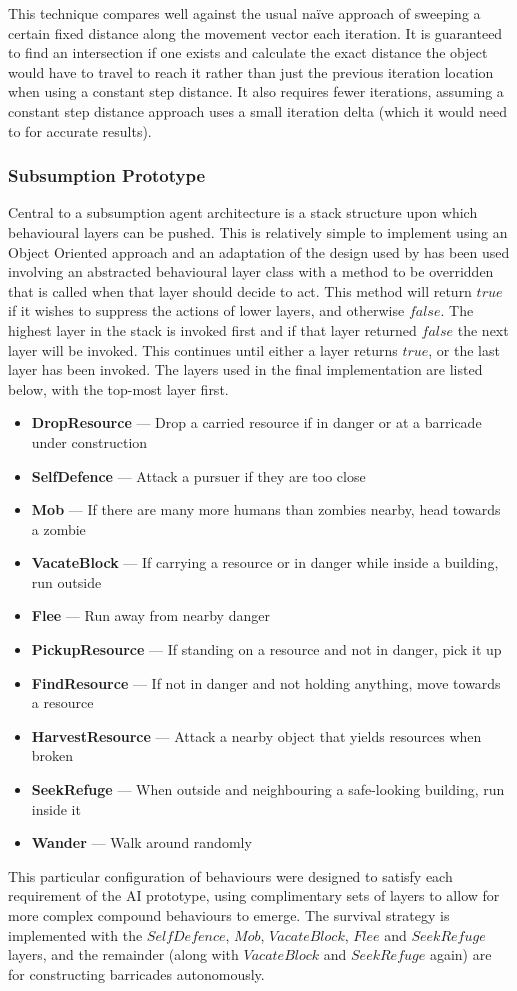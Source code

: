 \documentclass[a4paper,12pt]{article}
\newcommand{\layer}[2]{\item \textbf{#1} --- #2\vspace{-1mm}}
\begin{document}
This technique compares well against the usual na\"{i}ve approach of sweeping a certain fixed distance along the movement vector each iteration. It is guaranteed to find an intersection if one exists and calculate the exact distance the object would have to travel to reach it rather than just the previous iteration location when using a constant step distance. It also requires fewer iterations, assuming a constant step distance approach uses a small iteration delta (which it would need to for accurate results).

\subsubsection{Subsumption Prototype}\noindent
Central to a subsumption agent architecture is a stack structure upon which behavioural layers can be pushed. This is relatively simple to implement using an Object Oriented approach and an adaptation of the design used by  \citeyear{butler01} has been used involving an abstracted behavioural layer class with a method to be overridden that is called when that layer should decide to act. This method will return $true$ if it wishes to suppress the actions of lower layers, and otherwise $false$. The highest layer in the stack is invoked first and if that layer returned $false$ the next layer will be invoked. This continues until either a layer returns $true$, or the last layer has been invoked. The layers used in the final implementation are listed below, with the top-most layer first.

\noindent
\small{
\begin{itemize}
\layer{DropResource}{Drop a carried resource if in danger or at a barricade under construction}
\layer{SelfDefence}{Attack a pursuer if they are too close}
\layer{Mob}{If there are many more humans than zombies nearby, head towards a zombie}
\layer{VacateBlock}{If carrying a resource or in danger while inside a building, run outside}
\layer{Flee}{Run away from nearby danger}
\layer{PickupResource}{If standing on a resource and not in danger, pick it up}
\layer{FindResource}{If not in danger and not holding anything, move towards a resource}
\layer{HarvestResource}{Attack a nearby object that yields resources when broken}
\layer{SeekRefuge}{When outside and neighbouring a safe-looking building, run inside it}
\layer{Wander}{Walk around randomly}
\end{itemize}}

This particular configuration of behaviours were designed to satisfy each requirement of the AI prototype, using complimentary sets of layers to allow for more complex compound behaviours to emerge. The survival strategy is implemented with the $SelfDefence$, $Mob$, $VacateBlock$, $Flee$ and $SeekRefuge$ layers, and the remainder (along with $VacateBlock$ and $SeekRefuge$ again) are for constructing barricades autonomously.
\end{document}
